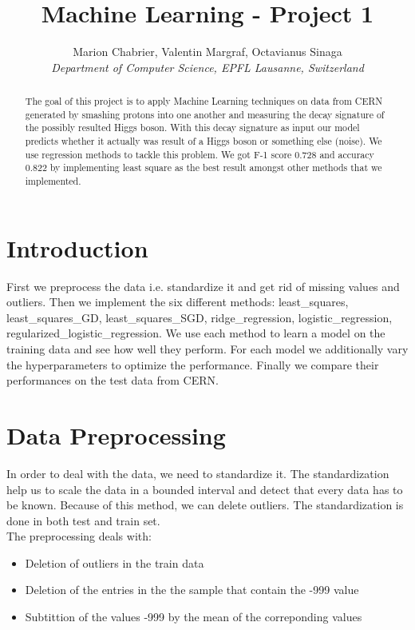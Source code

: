 \documentclass[10pt,conference,compsocconf]{IEEEtran}
\begin{document}
\title{Machine Learning - Project 1}

\author{
  Marion Chabrier, Valentin Margraf, Octavianus Sinaga\\
  \textit{Department of Computer Science, EPFL Lausanne, Switzerland}
}

\maketitle

\begin{abstract}
The goal of this project is to apply Machine Learning techniques on data from CERN generated by smashing protons into one another and measuring the decay signature of the possibly resulted Higgs boson. With this decay signature as input our model predicts whether it actually was result of a Higgs boson or something else (noise). We use regression methods to tackle this problem. We got F-1 score 0.728 and accuracy 0.822 by implementing least square as the best result amongst other methods that we implemented.
\end{abstract}

\section{Introduction}
First we preprocess the data i.e. standardize it and get rid of missing values and outliers.
Then we implement the six different methods: least\_squares, least\_squares\_GD, least\_squares\_SGD, ridge\_regression, logistic\_regression, regularized\_logistic\_regression. We use each method to learn a model on the training data and see how well they perform. For each model we additionally vary the hyperparameters to optimize the performance. Finally we compare their performances on the test data from CERN.



\section{Data Preprocessing}
\label{sec:prepro}
In order to deal with the data, we need to standardize it. The standardization help us to scale the data in a bounded interval and detect that every data has to be known.
Because of this method, we can delete outliers. The standardization is done in both test and train set.
\\
The preprocessing deals with:
\begin{itemize}
  \item Deletion of outliers in the train data
  \item Deletion of the entries in the the sample that contain the -999 value
  \item Subtittion of the values -999 by the mean of the correponding values
\end{itemize}
\end{document}
